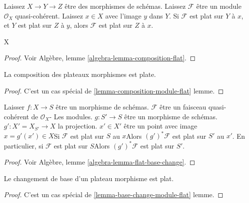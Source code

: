\begin{lemma}

\label{lemma-composition-module-flat}
Laissez $X \to Y \to Z$ être des morphismes de schémas. Laissez $\mathcal{F}$ être un module $\mathcal{O}_X$ quasi-cohérent. Laissez $x \in X$ avec l'image $y$ dans $Y$. Si $\mathcal{F}$ est plat sur $Y$ à $x$, et $Y$ est plat sur $Z$ à $y$, alors $\mathcal{F}$ est plat sur $Z$ à $x$.
\end{lemma}
X

\begin{proof}
Voir Algèbre, lemme \ref{algebra-lemma-composition-flat}.
\end{proof}

\begin{lemma}

\label{lemma-composition-flat}
La composition des plateaux morphismes est plate.
\end{lemma}

\begin{proof}
C'est un cas spécial de \ref{lemma-composition-module-flat} lemme.
\end{proof}

\begin{lemma}

\label{lemma-base-change-module-flat}

Laisser $f : X \to S$ être un morphisme de schémas. $\mathcal{F}$ être un faisceau quasi-cohérent de $\mathcal{O}_X$- Les modules. $g : S' \to S$ être un morphisme de schémas. $g' : X' = X_{S'} \to X$ la projection. $x' \in X'$ être un point avec image $x = g'(x') \in X$Si $\mathcal{F}$ est plat sur $S$ au $x$Alors
$(g')^*\mathcal{F}$ est plat sur $S'$ au $x'$. En particulier, si $\mathcal{F}$ est plat sur $S$Alors
$(g')^*\mathcal{F}$ est plat sur $S'$.

\end{lemma}

\begin{proof}
Voir Algèbre, lemme \ref{algebra-lemma-flat-base-change}.
\end{proof}

\begin{lemma}

\label{lemma-base-change-flat}
Le changement de base d'un plateau morphisme est plat.
\end{lemma}

\begin{proof}
C'est un cas spécial de \ref{lemma-base-change-module-flat} lemme.
\end{proof}


